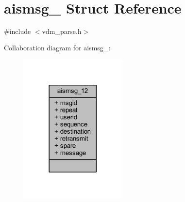 \hypertarget{structaismsg__12}{}\section{aismsg\+\_ Struct Reference}
\label{structaismsg__12}


{\ttfamily \#include $<$vdm\+\_\+parse.\+h$>$}



Collaboration diagram for aismsg\+\_\+:
\nopagebreak
\begin{figure}[H]
\begin{center}
\leavevmode
\includegraphics[width=153pt]{structaismsg__12__coll__graph}
\end{center}
\end{figure}
